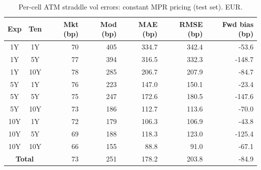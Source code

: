 \begin{table}[H]
\centering
\caption{Per-cell ATM straddle vol errors: constant MPR pricing (test set). EUR.}
\label{tab:constant_mpr_marketF0_per_cell_test}
\small
\begin{tabular}{@{}ccrrrrr@{}}
\toprule
\textbf{Exp} & \textbf{Ten} & \textbf{Mkt (bp)} & \textbf{Mod (bp)} & \textbf{MAE (bp)} & \textbf{RMSE (bp)} & \textbf{Fwd bias (bp)} \\
\midrule
  1Y & 1Y & 70 & 405 & 334.7 & 342.4 & -53.6 \\
  1Y & 5Y & 77 & 394 & 316.5 & 332.3 & -148.7 \\
  1Y & 10Y & 78 & 285 & 206.7 & 207.9 & -84.7 \\
  \midrule
  5Y & 1Y & 76 & 223 & 147.0 & 150.1 & -23.4 \\
  5Y & 5Y & 75 & 247 & 172.6 & 180.5 & -147.6 \\
  5Y & 10Y & 73 & 186 & 112.7 & 113.6 & -70.0 \\
  \midrule
  10Y & 1Y & 72 & 179 & 106.3 & 106.9 & -43.8 \\
  10Y & 5Y & 69 & 188 & 118.3 & 123.0 & -125.4 \\
  10Y & 10Y & 66 & 155 & 88.8 & 91.0 & -67.1 \\
  \midrule
  \multicolumn{2}{c}{\textbf{Total}} & 73 & 251 & 178.2 & 203.8 & -84.9 \\
\bottomrule
\end{tabular}
\end{table}